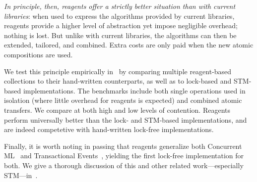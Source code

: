 \documentclass[preprint,nocopyrightspace]{sigplanconf}
\begin{document}
\emph{In principle, then, reagents offer a strictly better situation than with
  current libraries}: when used to express the algorithms provided by current
libraries, reagents provide a higher level of abstraction yet impose negligible
overhead; nothing is lost.  But unlike with current libraries, the algorithms
can then be extended, tailored, and combined.  Extra costs are only paid when
the new atomic compositions are used.  

We test this principle empirically in~ by comparing multiple
reagent-based collections to their hand-written counterparts, as well as to
lock-based and STM-based implementations.  The benchmarks include both single
operations used in isolation (where little overhead for reagents is expected)
and combined atomic transfers.  We compare at both high and low levels of
contention.  Reagents perform universally better than the lock- and STM-based
implementations, and are indeed competetive with hand-written lock-free
implementations.

Finally, it is worth noting in passing that reagents generalize both Concurrent
ML~\cite{?} and Transactional Events~\cite{?}, yielding the first lock-free
implementation for both.  We give a thorough discussion of this and other
related work---especially STM---in~.


\end{document}
